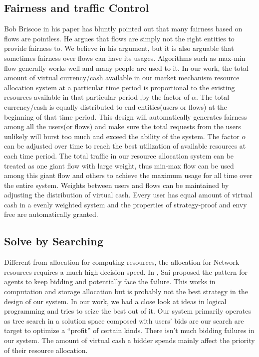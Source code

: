 \documentclass[a4paper,11pt,twocolumn]{article}
\begin{document}

\subsection{Fairness and traffic Control }
Bob Briscoe in his paper\cite{bob} has bluntly pointed out that many fairness based on flows are pointless. He argues that
 flows are simply not the right
entities to provide fairness to. We believe in his argument, but it is also arguable that sometimes fairness over flows
can have its usages. Algorithms such as max-min flow generally works well and many people are used to it. In our
work, the total amount of virtual currency/cash  available in our market mechanism resource allocation system at a 
particular time period is proportional to the existing resources available in that  particular period ,by the 
factor of $\alpha$. The total currency/cash is equally distributed to end entities(users or flows) at the beginning of that
 time period. This design will automatically generates fairness among all the users(or flows) and make sure the 
total requests from the users unlikely will  burst too much and exceed the ability of the system. 
The factor $\alpha$ can be 
adjusted over time to reach the best utilization of available resources at each time period. The total traffic 
in  our resource allocation system can be treated as one giant flow with large weight, thus min-max flow can be used
among this  giant flow and others to achieve the maximum usage for all time over the entire system. Weights between users and flows can be 
maintained by adjusting the distribution of virtual cash. Every user has equal amount of virtual cash in a evenly 
weighted system and the properties of strategy-proof and envy free are automatically granted.


\subsection{Solve by Searching}
Different from allocation for computing resources, the allocation for Network resources requires a much high 
decision speed. In \cite{Sai}, Sai proposed the pattern for agents to keep bidding and potentially face the failure. This works in computation and storage allocation but is
probably not the best strategy in the design of our system. In our work, we had a close look at ideas in logical programming
and tries to seize the best out of it. Our system primarily operates as tree search in a solution space composed
with users' bids are our search are target to optimize a ``profit'' of certain kinds. There isn't much bidding failures
in our system. The amount of virtual cash a bidder spends mainly affect the priority of their resource allocation. 
\end{document}

